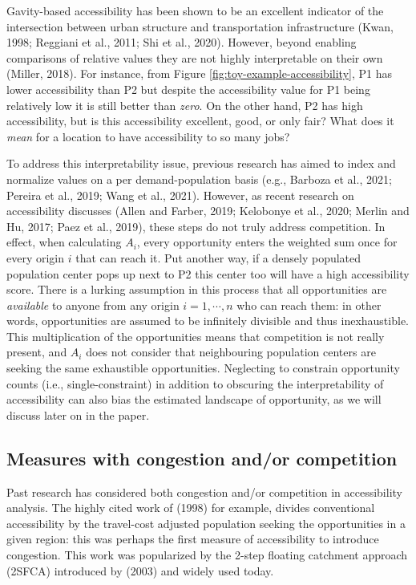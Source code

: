\documentclass[]{elsarticle} %
\begin{document}
Gavity-based accessibility has been shown to be an excellent indicator
of the intersection between urban structure and transportation
infrastructure (Kwan, 1998; Reggiani et al., 2011; Shi et al., 2020).
However, beyond enabling comparisons of relative values they are not
highly interpretable on their own (Miller, 2018). For instance, from
Figure \ref{fig:toy-example-accessibility}, P1 has lower accessibility
than P2 but despite the accessibility value for P1 being relatively low
it is still better than \emph{zero}. On the other hand, P2 has high
accessibility, but is this accessibility excellent, good, or only fair?
What does it \emph{mean} for a location to have accessibility to so many
jobs?

To address this interpretability issue, previous research has aimed to
index and normalize values on a per demand-population basis (e.g.,
Barboza et al., 2021; Pereira et al., 2019; Wang et al., 2021). However,
as recent research on accessibility discusses (Allen and Farber, 2019;
Kelobonye et al., 2020; Merlin and Hu, 2017; Paez et al., 2019), these
steps do not truly address competition. In effect, when calculating
\(A_i\), every opportunity enters the weighted sum once for every origin
\(i\) that can reach it. Put another way, if a densely populated
population center pops up next to P2 this center too will have a high
accessibility score. There is a lurking assumption in this process that
all opportunities are \emph{available} to anyone from any origin
\(i=1,\cdots,n\) who can reach them: in other words, opportunities are
assumed to be infinitely divisible and thus inexhaustible. This
multiplication of the opportunities means that competition is not really
present, and \(A_i\) does not consider that neighbouring population
centers are seeking the same exhaustible opportunities. Neglecting to
constrain opportunity counts (i.e., single-constraint) in addition to
obscuring the interpretability of accessibility can also bias the
estimated landscape of opportunity, as we will discuss later on in the
paper.

\hypertarget{measures-with-congestion-andor-competition}{%
\subsection{Measures with congestion and/or
competition}\label{measures-with-congestion-andor-competition}}

Past research has considered both congestion and/or competition in
accessibility analysis. The highly cited work of (1998) for example,
divides conventional accessibility by the travel-cost adjusted
population seeking the opportunities in a given region: this was perhaps
the first measure of accessibility to introduce congestion. This work
was popularized by the 2-step floating catchment approach (2SFCA)
introduced by (2003) and widely used today.
\end{document}
